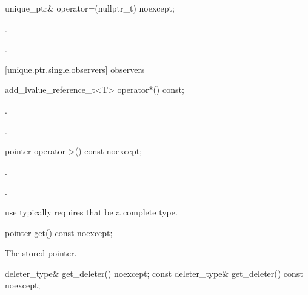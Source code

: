 \begin{itemdecl}
unique_ptr& operator=(nullptr_t) noexcept;
\end{itemdecl}

\begin{itemdescr}
\pnum
\effects {}.

\pnum
\postcondition {}

\pnum
\returns {}.
\end{itemdescr}

[unique.ptr.single.observers]{ observers}

\begin{itemdecl}
add_lvalue_reference_t<T> operator*() const;
\end{itemdecl}

\begin{itemdescr}
\pnum
\requires {}.

\pnum
\returns {}.

\end{itemdescr}

\begin{itemdecl}
pointer operator->() const noexcept;
\end{itemdecl}

\begin{itemdescr}
\pnum
\requires {}.

\pnum
\returns {}.

\pnum
\realnote use typically requires that  be a complete type.
\end{itemdescr}

\begin{itemdecl}
pointer get() const noexcept;
\end{itemdecl}

\begin{itemdescr}
\pnum
\returns The stored pointer.
\end{itemdescr}

\begin{itemdecl}
deleter_type& get_deleter() noexcept;
const deleter_type& get_deleter() const noexcept;
\end{itemdecl}

